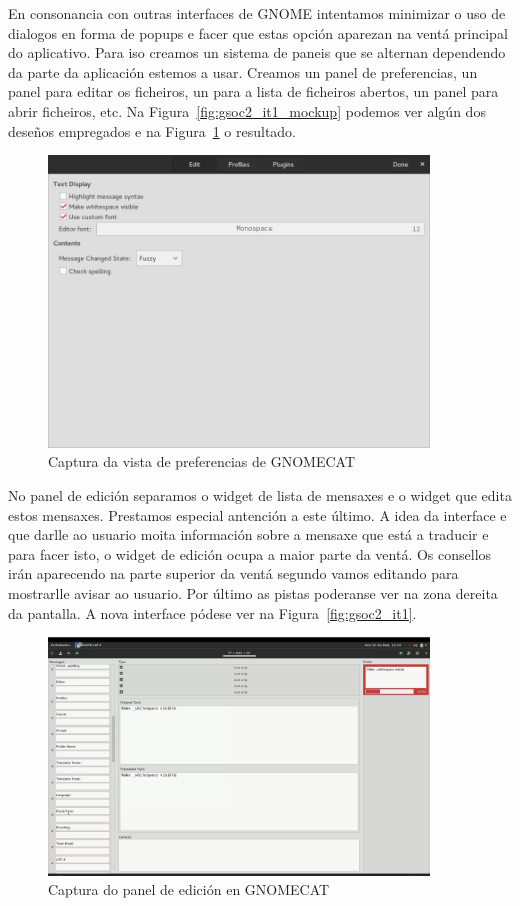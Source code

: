 En consonancia con outras interfaces de GNOME intentamos minimizar o uso de dialogos en forma de popups e facer que estas opción aparezan na ventá principal do aplicativo. Para iso creamos un sistema de paneis que se alternan dependendo da parte da aplicación estemos a usar. Creamos un panel de preferencias, un panel para editar os ficheiros, un para a lista de ficheiros abertos, un panel para abrir ficheiros, etc. Na Figura~\ref{fig:gsoc2_it1_mockup} podemos ver algún dos deseños empregados e na Figura~\ref{fig:gsoc2_it1_ui1} o resultado.

\begin{figure}[h!]
    \centering
    \includegraphics[width=0.9\textwidth]{img/gsoc2_it1_ui1.png} 
    \caption{Captura da vista de preferencias de GNOMECAT}
    \label{fig:gsoc2_it1_ui1}
\end{figure}

No panel de edición separamos o widget de lista de mensaxes e o widget que edita estos mensaxes. Prestamos especial antención a este último. A idea da interface e que darlle ao usuario moita información sobre a mensaxe que está a traducir e para facer isto, o widget de edición ocupa a maior parte da ventá. Os consellos irán aparecendo na parte superior da ventá segundo vamos editando para mostrarlle avisar ao usuario. Por último as pistas poderanse ver na zona dereita da pantalla. A nova interface pódese ver na Figura~\ref{fig:gsoc2_it1}.

\begin{figure}[h!]
    \centering
    \includegraphics[width=0.9\textwidth]{img/gsoc2_it1_ui2.png} 
    \caption{Captura do panel de edición en GNOMECAT}
    \label{fig:gsoc2_it1_ui2}
\end{figure}

